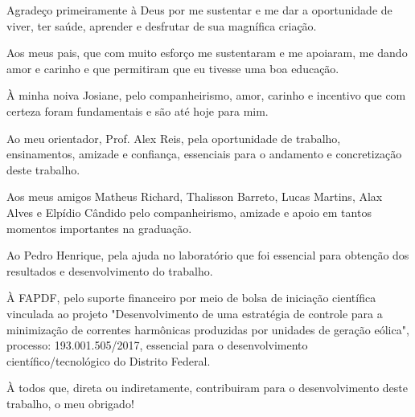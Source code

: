 \begin{agradecimentos}

Agradeço primeiramente à Deus por me sustentar e me dar a oportunidade de viver, ter saúde, 
aprender e desfrutar de sua magnífica criação.

Aos meus pais, que com muito esforço me sustentaram e me apoiaram, me dando amor e carinho 
e que permitiram que eu tivesse uma boa educação. 

À minha noiva Josiane, pelo companheirismo, amor, carinho e incentivo que com certeza foram fundamentais
e são até hoje para mim.

Ao meu orientador, Prof. Alex Reis, pela oportunidade de trabalho, ensinamentos, amizade e confiança,
essenciais para o andamento e concretização deste trabalho.

Aos meus amigos Matheus Richard, Thalisson Barreto, Lucas Martins, Alax Alves e Elpídio Cândido 
pelo companheirismo, amizade e apoio em tantos momentos importantes na graduação.

Ao Pedro Henrique, pela ajuda no laboratório que foi essencial para obtenção dos resultados e desenvolvimento do trabalho.

À FAPDF, pelo suporte financeiro por meio de bolsa de iniciação científica vinculada ao projeto "Desenvolvimento de uma estratégia de controle para a minimização de correntes harmônicas produzidas por unidades de geração eólica", processo: 193.001.505/2017, essencial para o desenvolvimento científico/tecnológico do Distrito Federal.

À todos que, direta ou indiretamente, contribuiram para o desenvolvimento deste trabalho, o meu obrigado!



\end{agradecimentos}
